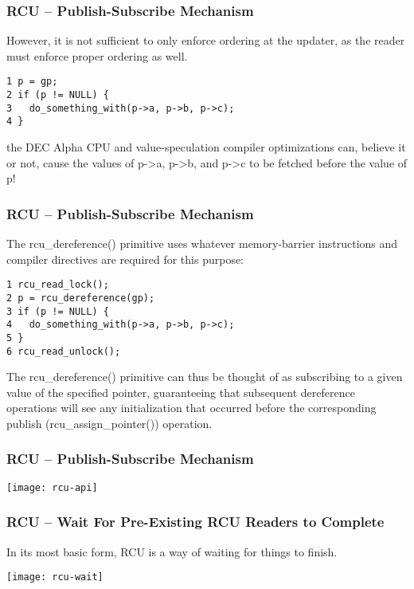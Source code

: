 \begin{frame}[fragile]
    \frametitle{RCU -- Publish-Subscribe Mechanism}
    \Large
    However, it is not sufficient to only enforce ordering at the updater, as the reader must enforce proper ordering as well.
    
    \small
    \begin{block}{}
        \begin{verbatim}
1 p = gp;
2 if (p != NULL) {
3   do_something_with(p->a, p->b, p->c);
4 }
        \end{verbatim}
    \end{block}  

\Large
the DEC Alpha CPU and value-speculation compiler optimizations can, believe it or not, cause the values of p->a, p->b, and p->c to be fetched before the value of p!
\end{frame}


\begin{frame}[fragile]
    \frametitle{RCU -- Publish-Subscribe Mechanism}
    \Large
    The rcu\_dereference() primitive uses whatever memory-barrier instructions and compiler directives are required for this purpose: 
    
    \small
    \begin{block}{}
        \begin{verbatim}
1 rcu_read_lock();
2 p = rcu_dereference(gp);
3 if (p != NULL) {
4   do_something_with(p->a, p->b, p->c);
5 }
6 rcu_read_unlock();
        \end{verbatim}
    \end{block}  
    
    \normalsize
The rcu\_dereference() primitive can thus be thought of as subscribing to a given value of the specified pointer, guaranteeing that subsequent dereference operations will see any initialization that occurred before the corresponding publish (rcu\_assign\_pointer()) operation. 
\end{frame}


\begin{frame}[fragile]
    \frametitle{RCU -- Publish-Subscribe Mechanism}
    \centering
    \texttt{[image: rcu-api]}
\end{frame}


\begin{frame}[fragile]
    \frametitle{RCU -- Wait For Pre-Existing RCU Readers to Complete}
    \Large
    In its most basic form, RCU is a way of waiting for things to finish. 
    
    \centering
\texttt{[image: rcu-wait]}
\end{frame}



